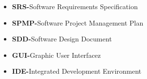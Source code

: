 \begin{itemize}
	\item \textbf{SRS-}Software Requirements Specification
	\item \textbf{SPMP-}Software Project Management Plan
	\item \textbf{SDD-}Software Design Document
	\item \textbf{GUI-}Graphic User Interfacez
	\item \textbf{IDE-}Integrated Development Environment
\end{itemize}
	